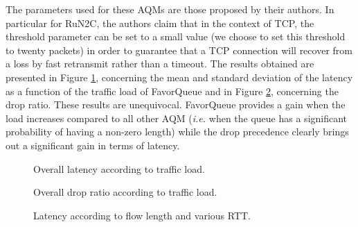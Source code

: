 \documentclass{elsart}
\begin{document}
The parameters used for these AQMs are those proposed by their authors. In particular for RuN2C, the authors claim that in the context of TCP, the threshold parameter can be set to a small value (we choose to set this threshold to twenty packets) in order to guarantee that a TCP connection will recover from a loss by fast retransmit rather than a timeout.
The results obtained are presented in Figure \ref{fig:load}, concerning the mean and standard deviation of the latency as a function of the traffic load of FavorQueue and in Figure \ref{fig:drop}, concerning the drop ratio.
These results are unequivocal. FavorQueue provides a gain when the load increases compared to all other AQM (\textit{i.e.} when the queue has a significant probability of having a non-zero length) while the drop precedence clearly brings out a significant gain in terms of latency.

\begin{figure}[htb!]
	\centering
	\caption{Overall latency according to traffic load.}
	\label{fig:load}
\end{figure}

\begin{figure}[htb!]
	\centering
	\caption{Overall drop ratio according to traffic load.}
	\label{fig:drop}
\end{figure}


\begin{figure}[htb!]
	\centering
	\caption{Latency according to flow length and various RTT.}
	\label{fig:RTTQ}
\end{figure}
\end{document}
